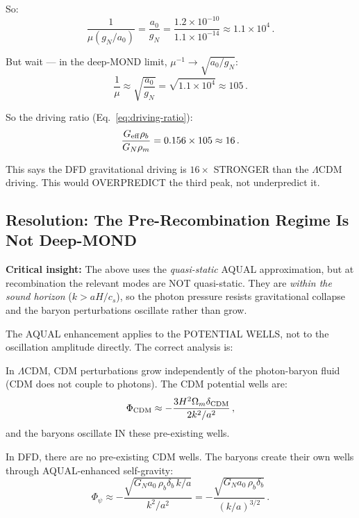 \documentclass[11pt]{article}
\newcommand{\ee}[1]{\times 10^{#1}}
\newcommand{\LCDM}{$\Lambda$CDM}
\newcommand{\Geff}{G_{\rm eff}}
\newcommand{\aM}{a_0}
\newcommand{\Om}{\Omega_m}
\begin{document}
So:
\begin{equation}
\frac{1}{\mu(g_N/\aM)} = \frac{\aM}{g_N}
= \frac{1.2\ee{-10}}{1.1\ee{-14}} \approx 1.1\ee{4}\,.
\end{equation}

But wait --- in the deep-MOND limit, $\mu^{-1} \to \sqrt{\aM/g_N}$:
\begin{equation}
\frac{1}{\mu} \approx \sqrt{\frac{\aM}{g_N}} = \sqrt{1.1\ee{4}} \approx 105\,.
\end{equation}

So the driving ratio (Eq.~\ref{eq:driving-ratio}):
\begin{equation}
\frac{\Geff\rho_b}{G_N\rho_m} = 0.156\times 105 \approx 16\,.
\end{equation}

This says the DFD gravitational driving is $16\times$ STRONGER than the
\LCDM{} driving.  This would OVERPREDICT the third peak, not underpredict it.

\subsection{Resolution: The Pre-Recombination Regime Is Not Deep-MOND}

\textbf{Critical insight:} The above uses the \emph{quasi-static} AQUAL
approximation, but at recombination the relevant modes are NOT quasi-static.
They are \emph{within the sound horizon} ($k > aH/c_s$), so the photon
pressure resists gravitational collapse and the baryon perturbations
oscillate rather than grow.

The AQUAL enhancement applies to the POTENTIAL WELLS, not to the oscillation
amplitude directly.  The correct analysis is:

In \LCDM, CDM perturbations grow independently of the photon-baryon fluid
(CDM does not couple to photons).  The CDM potential wells are:
\begin{equation}
\Phi_{\rm CDM} \approx -\frac{3H^2\Om\delta_{\rm CDM}}{2k^2/a^2}\,,
\end{equation}
and the baryons oscillate IN these pre-existing wells.

In DFD, there are no pre-existing CDM wells.  The baryons create their own
wells through AQUAL-enhanced self-gravity:
\begin{equation}
\Phi_\psi \approx -\frac{\sqrt{G_N\aM\,\rho_b\delta_b\,k/a}}{k^2/a^2}
= -\frac{\sqrt{G_N\aM\,\rho_b\delta_b}}{(k/a)^{3/2}}\,.
\label{eq:Phi-psi}
\end{equation}
\end{document}
